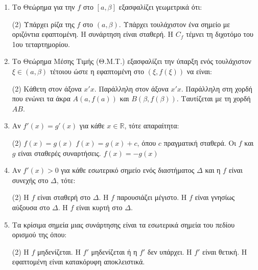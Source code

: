 \begin{enumerate}[label=\textbf{2.\arabic*.}, itemsep=4mm]
    \item Το Θεώρημα  για την $f$ στο $[a, \beta]$ εξασφαλίζει γεωμετρικά ότι:
    \begin{tasks}[label=\let\textdexiakeraia\relax\alph*.](2)
        \task Υπάρχει ρίζα της $f$ στο $(a, \beta)$.
        \task Υπάρχει τουλάχιστον ένα σημείο με οριζόντια εφαπτομένη.
        \task Η συνάρτηση είναι σταθερή.
        \task Η $C_f$ τέμνει τη διχοτόμο του 1ου τεταρτημορίου.
    \end{tasks}

    \item Το Θεώρημα Μέσης Τιμής (Θ.Μ.Τ.) εξασφαλίζει την ύπαρξη ενός τουλάχιστον $\xi \in (a, \beta)$ τέτοιου ώστε η εφαπτομένη στο $(\xi, f(\xi))$ να είναι:
    \begin{tasks}[label=\let\textdexiakeraia\relax\alph*.](2)
        \task Κάθετη στον άξονα $x'x$.
        \task Παράλληλη στον άξονα $x'x$.
        \task Παράλληλη στη χορδή που ενώνει τα άκρα $A(a, f(a))$ και $B(\beta, f(\beta))$.
        \task Ταυτίζεται με τη χορδή $AB$.
    \end{tasks}

    \item Αν $f'(x) = g'(x)$ για κάθε $x \in \mathbb{R}$, τότε απαραίτητα:
    \begin{tasks}[label=\let\textdexiakeraia\relax\alph*.](2)
        \task $f(x) = g(x)$
        \task $f(x) = g(x) + c$, όπου $c$ πραγματική σταθερά.
        \task Οι $f$ και $g$ είναι σταθερές συναρτήσεις.
        \task $f(x) = -g(x)$
    \end{tasks}

    \item Αν $f'(x) > 0$ για κάθε εσωτερικό σημείο ενός διαστήματος $\Delta$ και η $f$ είναι συνεχής στο $\Delta$, τότε:
    \begin{tasks}[label=\let\textdexiakeraia\relax\alph*.](2)
        \task Η $f$ είναι σταθερή στο $\Delta$.
        \task Η $f$ παρουσιάζει μέγιστο.
        \task Η $f$ είναι γνησίως αύξουσα στο $\Delta$.
        \task Η $f$ είναι κυρτή στο $\Delta$.
    \end{tasks}

    \item Τα κρίσιμα σημεία μιας συνάρτησης είναι τα εσωτερικά σημεία του πεδίου ορισμού της όπου:
    \begin{tasks}[label=\let\textdexiakeraia\relax\alph*.](2)
        \task Η $f$ μηδενίζεται.
        \task Η $f'$ μηδενίζεται ή η $f'$ δεν υπάρχει.
        \task Η $f'$ είναι θετική.
        \task Η εφαπτομένη είναι κατακόρυφη αποκλειστικά.
    \end{tasks}


\end{enumerate}
